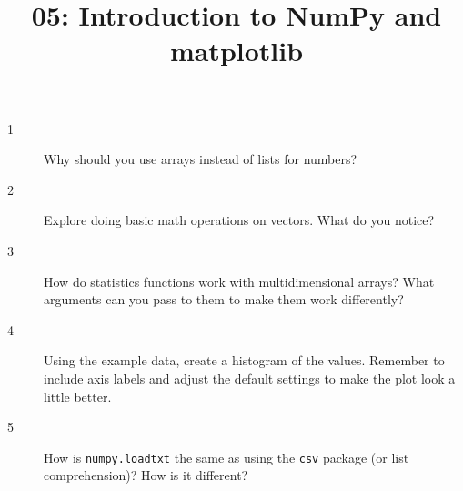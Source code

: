 \documentclass[10pt]{amsart}
\title{05: Introduction to NumPy and matplotlib}
\begin{document}
\maketitle

\begin{description}
\item[1] Why should you use arrays instead of lists for numbers?
\vspace{0.75in}

\item[2] Explore doing basic math operations on vectors. What do you notice?
\vspace{0.75in}

\item[3] How do statistics functions work with multidimensional arrays? What
arguments can you pass to them to make them work differently?
\vspace{0.75in}

\item[4] Using the example data, create a histogram of the values. Remember to
include axis labels and adjust the default settings to make the plot look a
little better.
\vspace{0.75in}

\item[5] How is \verb+numpy.loadtxt+ the same as using the \verb+csv+ package
(or list comprehension)? How is it different?
\vspace{0.75in}
\end{description}
\end{document}
